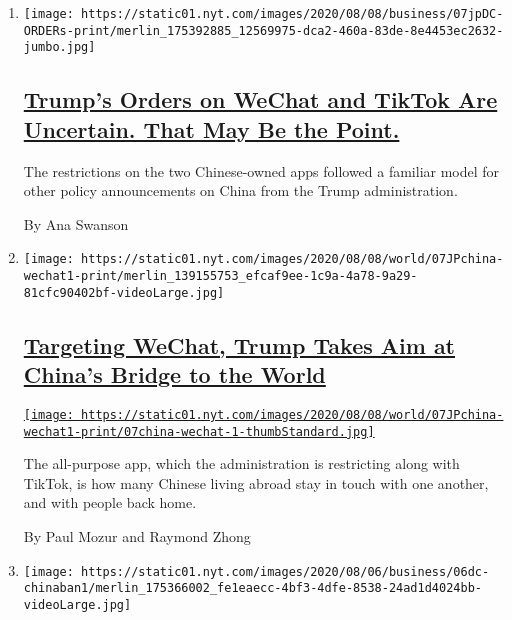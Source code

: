 \begin{enumerate}
\def\labelenumi{\arabic{enumi}.}
\item
  \texttt{[image: https://static01.nyt.com/images/2020/08/08/business/07jpDC-ORDERs-print/merlin\_175392885\_12569975-dca2-460a-83de-8e4453ec2632-jumbo.jpg]}

  \hypertarget{trumps-orders-on-wechat-and-tiktok-are-uncertain-that-may-be-the-point}{%
  \subsection{\texorpdfstring{\href{/2020/08/07/business/economy/trump-executive-order-tiktok-wechat.html}{Trump's
  Orders on WeChat and TikTok Are Uncertain. That May Be the
  Point.}}{Trump's Orders on WeChat and TikTok Are Uncertain. That May Be the Point.}}\label{trumps-orders-on-wechat-and-tiktok-are-uncertain-that-may-be-the-point}}

  The restrictions on the two Chinese-owned apps followed a familiar
  model for other policy announcements on China from the Trump
  administration.

  By Ana Swanson
\item
  \texttt{[image: https://static01.nyt.com/images/2020/08/08/world/07JPchina-wechat1-print/merlin\_139155753\_efcaf9ee-1c9a-4a78-9a29-81cfc90402bf-videoLarge.jpg]}

  \hypertarget{targeting-wechat-trump-takes-aim-at-chinas-bridge-to-the-world}{%
  \subsection{\texorpdfstring{\href{/2020/08/07/business/trump-china-wechat-tiktok.html}{Targeting
  WeChat, Trump Takes Aim at China's Bridge to the
  World}}{Targeting WeChat, Trump Takes Aim at China's Bridge to the World}}\label{targeting-wechat-trump-takes-aim-at-chinas-bridge-to-the-world}}

  \href{/2020/08/07/business/trump-china-wechat-tiktok.html}{\texttt{[image: https://static01.nyt.com/images/2020/08/08/world/07JPchina-wechat1-print/07china-wechat-1-thumbStandard.jpg]}}

  The all-purpose app, which the administration is restricting along
  with TikTok, is how many Chinese living abroad stay in touch with one
  another, and with people back home.

  By Paul Mozur and Raymond Zhong
\item
  \texttt{[image: https://static01.nyt.com/images/2020/08/06/business/06dc-chinaban1/merlin\_175366002\_fe1eaecc-4bf3-4dfe-8538-24ad1d4024bb-videoLarge.jpg]}


\end{enumerate}

